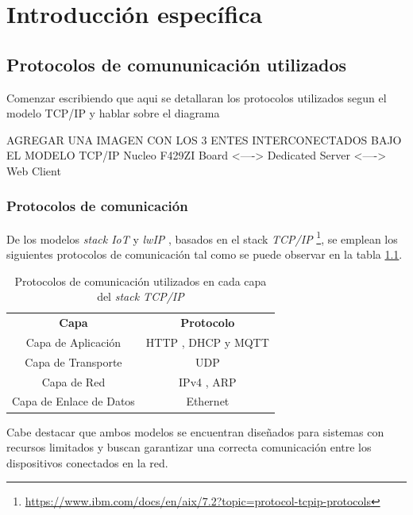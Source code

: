 \chapter{Introducción específica} %

\label{Chapter2}


\section{Protocolos de comununicación utilizados}

  Comenzar escribiendo que aqui se detallaran los protocolos utilizados segun el modelo TCP/IP y hablar sobre el diagrama    

  AGREGAR UNA IMAGEN CON LOS 3 ENTES INTERCONECTADOS BAJO EL MODELO TCP/IP 
        Nucleo F429ZI Board <----> Dedicated Server <----> Web Client


\subsection{Protocolos de comunicación}

De los modelos \textit{stack IoT} y \textit{lwIP} \citep{lwip}, basados en el stack \textit{TCP/IP} \footnote{\url{https://www.ibm.com/docs/en/aix/7.2?topic=protocol-tcpip-protocols}}, se emplean los siguientes protocolos de comunicación tal como se puede observar en la tabla \ref{tab:capa_protocolo}. 


\begin{table}[h]
\centering
\caption{Protocolos de comunicación utilizados en cada capa del \textit{stack TCP/IP}}
\label{tab:capa_protocolo}
\begin{tabular}{|c|c|}
\hline
\textbf{Capa} & \textbf{Protocolo} \\ \cline{1-2}
Capa de Aplicación & HTTP \citep{http}, DHCP \citep{dhcp} y MQTT \citep{mqtt} \\ \cline{1-2}
Capa de Transporte & UDP \citep{udp} \\ \cline{1-2}
Capa de Red & IPv4 \citep{ipv4}, ARP \citep{arp} \\ \cline{1-2}
Capa de Enlace de Datos & Ethernet \citep{ethernet} \\ \cline{1-2}
\end{tabular}
\end{table}

Cabe destacar que ambos modelos se encuentran diseñados para sistemas con recursos limitados y buscan garantizar una correcta comunicación entre los dispositivos conectados en la red.


